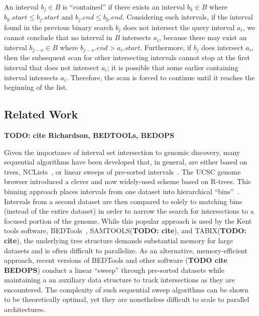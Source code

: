 \documentclass{bioinfo}
\begin{document}
	An interval $b_j\in B$ is ``contained'' if there exists an interval
	$b_k \in B$ where $b_k.start \leq b_j.start$ and $b_j.end \leq
	b_k.end$.  Considering such intervals, if the interval found in the
	previous binary search $b_j$ does not intersect the query interval
	$a_i$, we cannot conclude that no interval in $B$ intersects $a_i$,
	because there may exist an interval $b_{j-x} \in B$ where $b_{j-x}.end
	> a_i.start$.  Furthermore, if $b_j$ does intersect $a_i$, then the
	subsequent scan for other intersecting intervals cannot stop at the
	first interval that does not intersect $a_i$; it is possible that some
	earlier containing interval intersects $a_i$. Therefore, the scan is
	forced to continue until it reaches the beginning of the list.
	

	
	\subsection{Related Work}

	\textbf{TODO: cite Richardson, BEDTOOLs, BEDOPS}

	Given the importance of interval set intersection to genomic discovery, many
	sequential algorithms have been developed that, in general, are either based on trees,
	NCLists~\citep{alekseyenko2007}, or linear sweeps of pre-sorted intervals~\citep{richardson2006}. The 
	UCSC genome browser introduced a clever and now widely-used scheme based on R-trees. This binning 
	approach places intervals from one dataset into hierarchical ``bins''~\citep{kent2002}.  
	Intervals from a second dataset are then compared to solely to matching bins (instead of the 
	entire dataset) in order to narrow the search for intersections to a focused portion of the genome.  
	While this popular approach is used by the Kent tools software, BEDTools~\citep{quinlan2010}, 
	SAMTOOLS(\textbf{TODO: cite}), and TABIX(\textbf{TODO: cite}), the underlying tree structure 
	demands substantial memory for large datasets and is often difficult to parallelize. As an alternative,
	memory-efficient approach, recent versions of BEDTools and other software (\textbf{TODO cite BEDOPS})
	conduct a linear ``sweep'' through pre-sorted datasets while maintaining a
	an auxiliary data structure to track intersections as they are encountered. The
	complexity of such sequential sweep algorithms can be shown to be theoretically
	optimal, yet they are nonetheless difficult to scale to parallel architectures.

	
\end{document}
